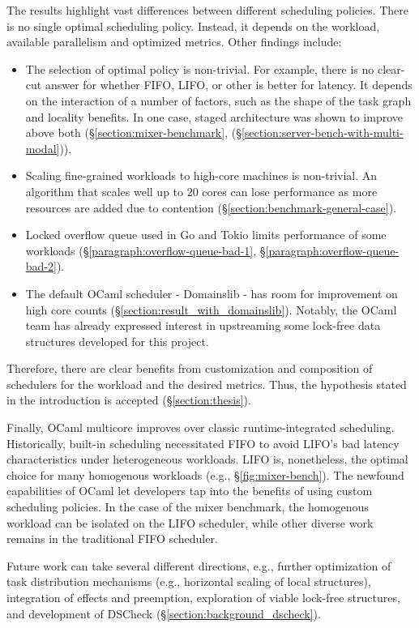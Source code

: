 \documentclass[12pt,a4paper,twoside]{report}
\begin{document}
The results highlight vast differences between different scheduling policies. There is no single optimal scheduling policy. Instead, it depends on the workload, available parallelism and optimized metrics. Other findings include: 
\begin{itemize}
    \item The selection of optimal policy is non-trivial. For example, there is no clear-cut answer for whether FIFO, LIFO, or other is better for latency. It depends on the interaction of a number of factors, such as the shape of the task graph and locality benefits. In one case, staged architecture was shown to improve above both (\S\ref{section:mixer-benchmark}, (\S\ref{section:server-bench-with-multi-modal})).
    \item Scaling fine-grained workloads to high-core machines is non-trivial. An algorithm that scales well up to 20 cores can lose performance as more resources are added due to contention (\S\ref{section:benchmark-general-case}).
    \item Locked overflow queue used in Go and Tokio limits performance of some workloads (\S\ref{paragraph:overflow-queue-bad-1}, \S\ref{paragraph:overflow-queue-bad-2}).
    \item The default OCaml scheduler - Domainslib \cite{ocamlmul59:online} - has room for improvement on high core counts (\S\ref{section:result_with_domainslib}). Notably, the OCaml team has already expressed interest in upstreaming some lock-free data structures developed for this project.
\end{itemize}
Therefore, there are clear benefits from customization and composition of schedulers for the workload and the desired metrics. Thus, the hypothesis stated in the introduction is accepted (\S\ref{section:thesis}). 

Finally, OCaml multicore improves over classic runtime-integrated scheduling. Historically, built-in scheduling necessitated FIFO to avoid LIFO's bad latency characteristics under heterogeneous workloads. LIFO is, nonetheless, the optimal choice for many homogenous workloads (e.g., \S\ref{fig:mixer-bench}). The newfound capabilities of OCaml let developers tap into the benefits of using custom scheduling policies. In the case of the mixer benchmark, the homogenous workload can be isolated on the LIFO scheduler, while other diverse work remains in the traditional FIFO scheduler.

Future work can take several different directions, e.g., further optimization of task distribution mechanisms (e.g., horizontal scaling of local structures), integration of effects and preemption, exploration of viable lock-free structures, and development of DSCheck (\S\ref{section:background_dscheck}). 
\end{document}
